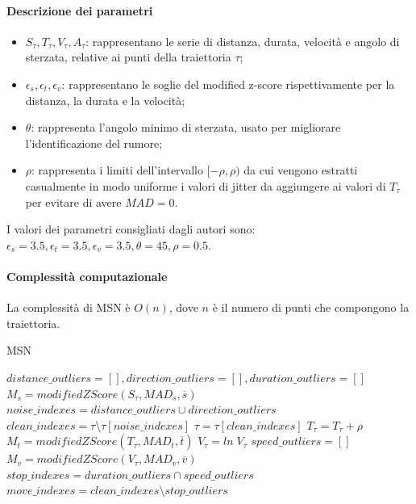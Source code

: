 \documentclass[12pt]{article}
\begin{document}
\paragraph{Descrizione dei parametri}
\begin{itemize}
    \item $S_\tau, T_\tau, V_\tau, A_\tau$: rappresentano le serie di distanza, durata, velocità e angolo di sterzata, relative ai punti della traiettoria $\tau$;
    \item $\epsilon_s, \epsilon_t, \epsilon_v$: rappresentano le soglie del modified z-score rispettivamente per la distanza, la durata e la velocità;
    \item $\theta$: rappresenta l'angolo minimo di sterzata, usato per migliorare l'identificazione del rumore;
    \item $\rho$: rappresenta i limiti dell'intervallo $[-\rho, \rho)$ da cui vengono estratti casualmente in modo uniforme i valori di jitter da aggiungere ai valori di $T_\tau$ per evitare di avere $MAD=0$. 
\end{itemize}
I valori dei parametri consigliati dagli autori sono: $\epsilon_s = 3.5, \epsilon_t = 3.5, \epsilon_v = 3.5, \theta = 45, \rho=0.5$.

\paragraph{Complessità computazionale} La complessità di MSN è $O(n)$, dove $n$ è il numero di punti che compongono la traiettoria.

\begin{algorithm}
    \caption{MSN}\label{MSN}
    $distance\_outliers = [], direction\_outliers = [], duration\_outliers = []$\;
    $M_s = modifiedZScore(S_\tau, MAD_s, \overline{s})$\;
    $noise\_indexes = distance\_outliers \cup direction\_outliers$\;
    $clean\_indexes = \tau \setminus \tau[noise\_indexes]$\;
    $\tau = \tau[clean\_indexes]$\;
    $T_\tau = T_\tau + \rho$\;
    $M_t = modifiedZScore(T_\tau, MAD_t, \overline{t})$\;
    $V_\tau = ln\;V_\tau$\;
    $speed\_outliers = []$\;
    $M_v = modifiedZScore(V_\tau, MAD_v, \overline{v})$\;
    $stop\_indexes = duration\_outliers \cap speed\_outliers$\;
    $move\_indexes = clean\_indexes \setminus stop\_outliers$\;
\end{algorithm}
\end{document}
